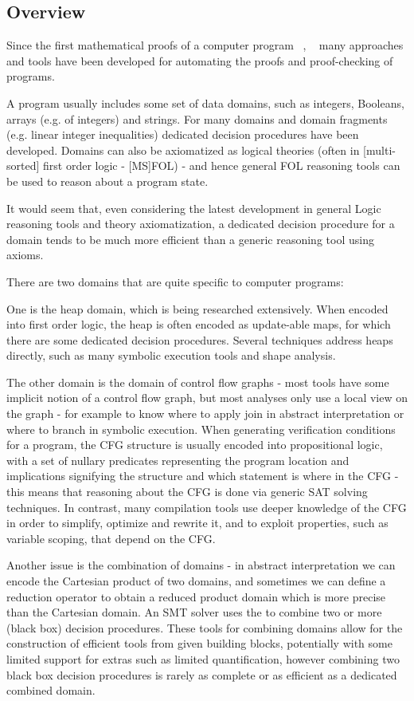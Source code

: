 \subsection{Overview}
Since the first mathematical proofs of a computer program ~\cite{DBLP:journals/cacm/Hoare69}, ~\cite{FLOYD67} many approaches and tools have been developed for automating the proofs and proof-checking of programs.

A program usually includes some set of data domains, such as integers, Booleans, arrays (e.g. of integers) and strings.
For many domains and domain fragments (e.g. linear integer inequalities) dedicated decision procedures have been developed.
Domains can also be axiomatized as logical theories (often in [multi-sorted] first order logic - [MS]FOL) - and hence general FOL reasoning tools can be used to reason about a program state.

It would seem that, even considering the latest development in general Logic reasoning tools and theory axiomatization, a dedicated decision procedure for a domain tends to be much more efficient than a generic reasoning tool using axioms.

There are two domains that are quite specific to computer programs:
 
One is the heap domain, which is being researched extensively.
When encoded into first order logic, the heap is often encoded as update-able maps, for which there are some dedicated decision procedures.
Several techniques address heaps directly, such as many symbolic execution tools and shape analysis.

The other domain is the domain of control flow graphs - most tools have some implicit notion of a control flow graph, but most analyses only use a local view on the graph - for example to know where to apply join in abstract interpretation or where to branch in symbolic execution.
When generating verification conditions for a program, the CFG structure is usually encoded into propositional logic, with a set of nullary predicates representing the program location and implications signifying the structure and which statement is where in the CFG - this means that reasoning about the CFG is done via generic SAT solving techniques.
In contrast, many compilation tools use deeper knowledge of the CFG in order to simplify, optimize and rewrite it, and to exploit properties, such as variable scoping, that depend on the CFG.

Another issue is the combination of domains - in abstract interpretation we can encode the Cartesian product of two domains, and sometimes we can define a reduction operator to obtain a reduced product domain which is more precise than the Cartesian domain.
An SMT solver uses the to combine two or more (black box) decision procedures.
These tools for combining domains allow for the construction of efficient tools from given building blocks, potentially with some limited support for extras such as  limited quantification, however combining two black box decision procedures is rarely as complete or as efficient as a dedicated combined domain.

